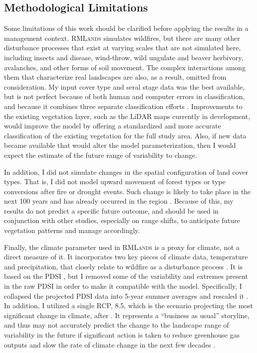 \subsection*{Methodological Limitations} %
Some limitations of this work should be clarified before applying the results in a management context. \textsc{RMLands} simulates wildfires, but there are many other disturbance processes that exist at varying scales that are not simulated here, including insects and disease, wind-throw, wild ungulate and beaver herbivory, avalanches, and other forms of soil movement. The complex interactions among them that characterize real landscapes are also, as a result, omitted from consideration. %
My input cover type and seral stage data was the best available, but is not perfect because of both human and computer errors in classification, and because it combines three separate classification efforts \citep{USDAForestService2009}. Improvements to the existing vegetation layer, such as the LiDAR maps currently in development, would improve the model by offering a standardized and more accurate classification of the existing vegetation for the full study area. Also, if new data became available that would alter the model parameterization, then I would expect the estimate of the future range of variability to change. 

In addition, I did not simulate changes in the spatial configuration of land cover types. That is, I did not model upward movement of forest types or type conversions after fire or drought events. Such change is likely to take place in the next 100 years and has already occurred in the region \citep{Bachelet2001}. Because of this, my results do not predict a specific future outcome, and should be used in conjunction with other studies, especially on range shifts, to anticipate future vegetation patterns and manage accordingly. 

Finally, the climate parameter used in \textsc{RMLands} is a proxy for climate, not a direct measure of it. It incorporates two key pieces of climate data, temperature and precipitation, that closely relate to wildfire as a disturbance process \citep{Cushman2011}. It is based on the PDSI \citep{HeimJr2002}, but I removed some of the variability and extremes present in the raw PDSI in order to make it compatible with the model. Specifically, I collapsed the projected PDSI data into 5-year summer averages and rescaled it \citep{Cushman2011}. In addition, I utilized a single RCP, 8.5, which is the scenario projecting the most significant change in climate, after \citet{Cook2014}. It represents a ``business as usual'' storyline, and thus may not accurately predict the change to the landscape range of variability in the future if significant action is taken to reduce greenhouse gas outputs and slow the rate of climate change in the next few decades \citep{Riahi2011}.







